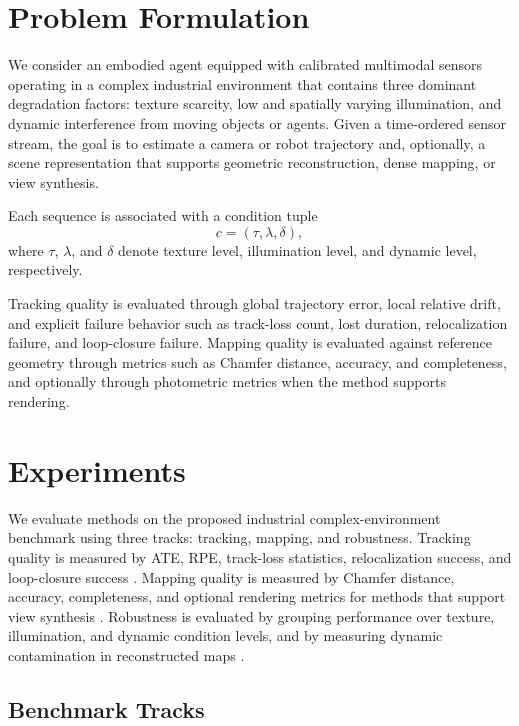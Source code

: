 \documentclass[10pt,twocolumn]{article}
\begin{document}
\section{Problem Formulation}

We consider an embodied agent equipped with calibrated multimodal sensors operating in a complex industrial environment that contains three dominant degradation factors: texture scarcity, low and spatially varying illumination, and dynamic interference from moving objects or agents. Given a time-ordered sensor stream, the goal is to estimate a camera or robot trajectory and, optionally, a scene representation that supports geometric reconstruction, dense mapping, or view synthesis.

Each sequence is associated with a condition tuple
\begin{equation}
    c = (\tau, \lambda, \delta),
\end{equation}
where $\tau$, $\lambda$, and $\delta$ denote texture level, illumination level, and dynamic level, respectively.

Tracking quality is evaluated through global trajectory error, local relative drift, and explicit failure behavior such as track-loss count, lost duration, relocalization failure, and loop-closure failure. Mapping quality is evaluated against reference geometry through metrics such as Chamfer distance, accuracy, and completeness, and optionally through photometric metrics when the method supports rendering.

\section{Experiments}

We evaluate methods on the proposed industrial complex-environment benchmark using three tracks: tracking, mapping, and robustness. Tracking quality is measured by ATE, RPE, track-loss statistics, relocalization success, and loop-closure success \cite{GSSLAM2024,SplaTAM2024,GSLoc2024}. Mapping quality is measured by Chamfer distance, accuracy, completeness, and optional rendering metrics for methods that support view synthesis \cite{GSSLAM2024,SplaTAM2024,GaussianSLAM2024}. Robustness is evaluated by grouping performance over texture, illumination, and dynamic condition levels, and by measuring dynamic contamination in reconstructed maps \cite{TexturelessORB2024,LLGaussianMap2024,DynaGSLAM2024,WildGSSLAM2024}.

\subsection{Benchmark Tracks}
\end{document}
